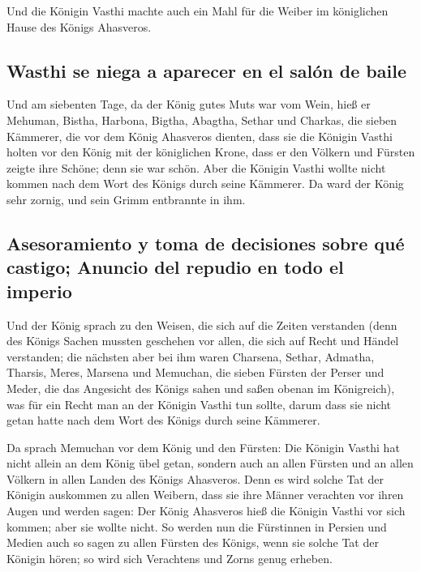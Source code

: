  Und die Königin Vasthi machte auch ein Mahl für die
Weiber im königlichen Hause des Königs Ahasveros.

\hypertarget{wasthi-se-niega-a-aparecer-en-el-saluxf3n-de-baile}{%
\subsection{Wasthi se niega a aparecer en el salón de
baile}\label{wasthi-se-niega-a-aparecer-en-el-saluxf3n-de-baile}}

 Und am siebenten Tage, da der König gutes Muts war vom
Wein, hieß er Mehuman, Bistha, Harbona, Bigtha, Abagtha, Sethar und
Charkas, die sieben Kämmerer, die vor dem König Ahasveros dienten,
 dass sie die Königin Vasthi holten vor den König mit der
königlichen Krone, dass er den Völkern und Fürsten zeigte ihre Schöne;
denn sie war schön.  Aber die Königin Vasthi wollte nicht
kommen nach dem Wort des Königs durch seine Kämmerer. Da ward der König
sehr zornig, und sein Grimm entbrannte in ihm.

\hypertarget{asesoramiento-y-toma-de-decisiones-sobre-quuxe9-castigo-anuncio-del-repudio-en-todo-el-imperio}{%
\subsection{Asesoramiento y toma de decisiones sobre qué castigo;
Anuncio del repudio en todo el
imperio}\label{asesoramiento-y-toma-de-decisiones-sobre-quuxe9-castigo-anuncio-del-repudio-en-todo-el-imperio}}

 Und der König sprach zu den Weisen, die sich auf die
Zeiten verstanden (denn des Königs Sachen mussten geschehen vor allen,
die sich auf Recht und Händel verstanden;  die nächsten
aber bei ihm waren Charsena, Sethar, Admatha, Tharsis, Meres, Marsena
und Memuchan, die sieben Fürsten der Perser und Meder, die das Angesicht
des Königs sahen und saßen obenan im Königreich),  was
für ein Recht man an der Königin Vasthi tun sollte, darum dass sie nicht
getan hatte nach dem Wort des Königs durch seine Kämmerer.

 Da sprach Memuchan vor dem König und den Fürsten: Die
Königin Vasthi hat nicht allein an dem König übel getan, sondern auch an
allen Fürsten und an allen Völkern in allen Landen des Königs Ahasveros.
 Denn es wird solche Tat der Königin auskommen zu allen
Weibern, dass sie ihre Männer verachten vor ihren Augen und werden
sagen: Der König Ahasveros hieß die Königin Vasthi vor sich kommen; aber
sie wollte nicht.  So werden nun die Fürstinnen in
Persien und Medien auch so sagen zu allen Fürsten des Königs, wenn sie
solche Tat der Königin hören; so wird sich Verachtens und Zorns genug
erheben.


